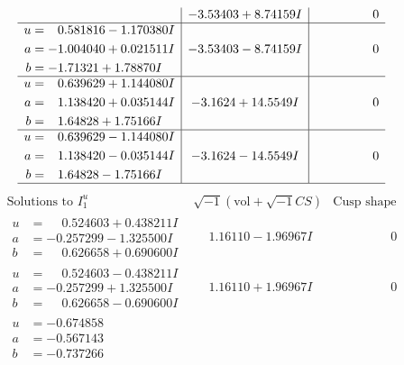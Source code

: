 \documentclass[1p]{elsarticle_modified}
\theoremstyle{definition}
\newcommand{\I}{\sqrt{-1}}
\begin{document}
$$\begin{array}{c|c|c}
 & -3.53403 + 8.74159 I & \phantom{-0.000000 } 0 \\ \hline\begin{aligned}
u &= \phantom{-}0.581816 - 1.170380 I \\
a &= -1.004040 + 0.021511 I \\
b &= -1.71321 + 1.78870 I\end{aligned}
 & -3.53403 - 8.74159 I & \phantom{-0.000000 } 0 \\ \hline\begin{aligned}
u &= \phantom{-}0.639629 + 1.144080 I \\
a &= \phantom{-}1.138420 + 0.035144 I \\
b &= \phantom{-}1.64828 + 1.75166 I\end{aligned}
 & -3.1624 + 14.5549 I & \phantom{-0.000000 } 0 \\ \hline\begin{aligned}
u &= \phantom{-}0.639629 - 1.144080 I \\
a &= \phantom{-}1.138420 - 0.035144 I \\
b &= \phantom{-}1.64828 - 1.75166 I\end{aligned}
 & -3.1624 - 14.5549 I & \phantom{-0.000000 } 0\\
 \hline 
 \end{array}$$\newpage$$\begin{array}{c|c|c}  
\text{Solutions to }I^u_{1}& \I (\text{vol} + \sqrt{-1}CS) & \text{Cusp shape}\\
 \hline 
\begin{aligned}
u &= \phantom{-}0.524603 + 0.438211 I \\
a &= -0.257299 - 1.325500 I \\
b &= \phantom{-}0.626658 + 0.690600 I\end{aligned}
 & \phantom{-}1.16110 - 1.96967 I & \phantom{-0.000000 } 0 \\ \hline\begin{aligned}
u &= \phantom{-}0.524603 - 0.438211 I \\
a &= -0.257299 + 1.325500 I \\
b &= \phantom{-}0.626658 - 0.690600 I\end{aligned}
 & \phantom{-}1.16110 + 1.96967 I & \phantom{-0.000000 } 0 \\ \hline\begin{aligned}
u &= -0.674858\phantom{ +0.000000I} \\
a &= -0.567143\phantom{ +0.000000I} \\
b &= -0.737266\phantom{ +0.000000I}\end{aligned}

\end{array}$$
\end{document}
